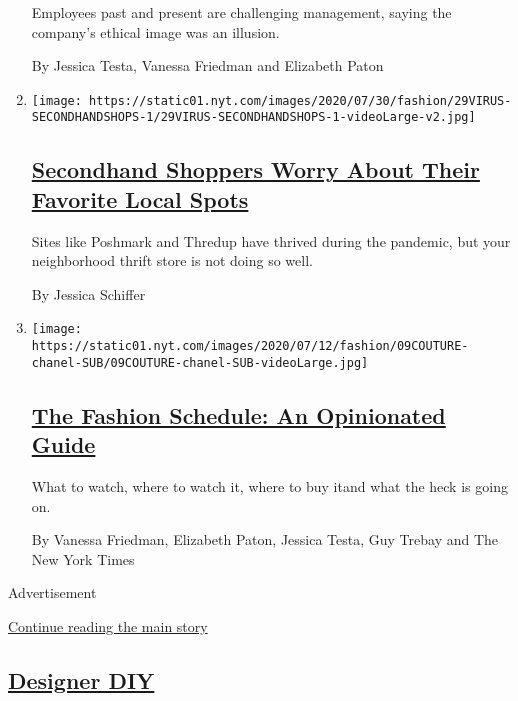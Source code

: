 \begin{enumerate}
  Employees past and present are challenging management, saying the
  company's ethical image was an illusion.

  By Jessica Testa, Vanessa Friedman and Elizabeth Paton
\item
  \texttt{[image: https://static01.nyt.com/images/2020/07/30/fashion/29VIRUS-SECONDHANDSHOPS-1/29VIRUS-SECONDHANDSHOPS-1-videoLarge-v2.jpg]}

  \hypertarget{secondhand-shoppers-worry-about-their-favorite-local-spots}{%
  \subsection{\texorpdfstring{\href{/2020/07/29/style/secondhand-clothes-coronavirus-safety.html}{Secondhand
  Shoppers Worry About Their Favorite Local
  Spots}}{Secondhand Shoppers Worry About Their Favorite Local Spots}}\label{secondhand-shoppers-worry-about-their-favorite-local-spots}}

  Sites like Poshmark and Thredup have thrived during the pandemic, but
  your neighborhood thrift store is not doing so well.

  By Jessica Schiffer
\item
  \texttt{[image: https://static01.nyt.com/images/2020/07/12/fashion/09COUTURE-chanel-SUB/09COUTURE-chanel-SUB-videoLarge.jpg]}

  \hypertarget{the-fashion-schedule-an-opinionated-guide}{%
  \subsection{\texorpdfstring{\href{/article/fashion-week-trends-2020.html}{The
  Fashion Schedule: An Opinionated
  Guide}}{The Fashion Schedule: An Opinionated Guide}}\label{the-fashion-schedule-an-opinionated-guide}}

  What to watch, where to watch it, where to buy itand what the heck is
  going on.

  By Vanessa Friedman, Elizabeth Paton, Jessica Testa, Guy Trebay and
  The New York Times
\end{enumerate}

Advertisement

\protect\hyperlink{after-mid1}{Continue reading the main story}

\hypertarget{designer-diy}{%
\subsection{\texorpdfstring{\href{/issue/fashion/2020/06/19/designer-diy}{Designer
DIY}}{Designer DIY}}\label{designer-diy}}

